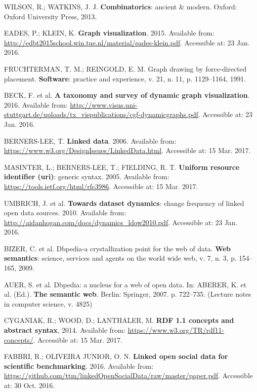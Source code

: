 \documentclass[
12pt,		%
openright,	%
twoside,  %
a4paper,			%
chapter=TITLE,		%
english,			%
french,				%
spanish,			%
brazil				%
]{USPSC}
\begin{document}
\begin{thebibliography}{999}
	WILSON, R.; WATKINS, J. J. \textbf{Combinatorics}: ancient \& modern. Oxford: Oxford University Press, 2013.

	EADES, P.; KLEIN, K. \textbf{Graph visualization}. 2015. Available from: \url{http://edbt2015school.win.tue.nl/material/eades-klein.pdf}. Accessible at: 23 Jan. 2016.

	FRUCHTERMAN, T. M.; REINGOLD, E. M. Graph drawing by force-directed placement. \textbf{Software}: practice and experience, v. 21, n. 11, p. 1129–1164, 1991.

	BECK, F. et al. \textbf{A taxonomy and survey of dynamic graph visualization}. 2016. Available from: \url{http://www.visus.uni-stuttgart.de/uploads/tx_vispublications/cgf-dynamicgraphs.pdf}. Accessible at: 23 Jan. 2016.

	BERNERS-LEE, T. \textbf{Linked data}. 2006. Available from: \url{https://www.w3.org/DesignIssues/LinkedData.html}. Accessible at: 15 Mar. 2017.

	MASINTER, L.; BERNERS-LEE, T.; FIELDING, R. T. \textbf{Uniform resource identifier (uri)}: generic syntax. 2005. Available from: \url{https://tools.ietf.org/html/rfc3986}. Accessible at: 15 Mar. 2017.

	UMBRICH, J. et al. \textbf{Towards dataset dynamics}: change frequency of linked open data sources. 2010. Available from: \url{http://aidanhogan.com/docs/dynamics_ldow2010.pdf}. Accessible at: 23 Jan. 2016.

	BIZER, C. et al. Dbpedia-a crystallization point for the web of data. \textbf{Web semantics}: science, services and agents on the world wide web, v. 7, n. 3, p. 154–165, 2009.

	AUER, S. et al. Dbpedia: a nucleus for a web of open data. In: ABERER, K. et al. (Ed.). \textbf{The semantic web}. Berlin: Springer, 2007. p. 722–735. (Lecture notes in computer science, v. 4825)

	CYGANIAK, R.; WOOD, D.; LANTHALER, M. \textbf{RDF 1.1 concepts and abstract syntax}, 2014. Available from: \url{https://www.w3.org/TR/rdf11-concepts/}. Accessible at: 15 Mar. 2017.

	FABBRI, R.; OLIVEIRA JUNIOR, O. N. \textbf{Linked open social data for scientific benchmarking}. 2016. Available from: \url{https://github.com/ttm/linkedOpenSocialData/raw/master/paper.pdf}. Accessible at: 30 Oct. 2016.


\end{thebibliography}
\end{document}
